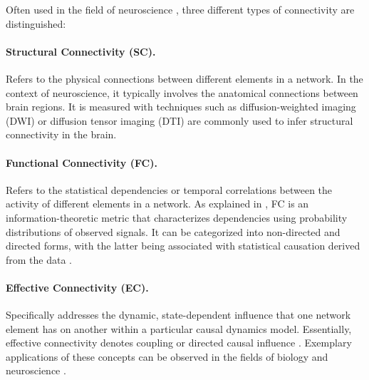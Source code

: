 Often used in the field of neuroscience \cite{Karwowski2019Applicationgraphtheory}, three different types of connectivity are distinguished\cite{Park2013Structuralfunctionalbrain,FaskowitzEdgesbrainnetworks}:

\paragraph*{Structural Connectivity (SC).} Refers to the physical connections between different elements in a network. In the context of neuroscience, it typically involves the anatomical connections between brain regions. It is measured with techniques such as diffusion-weighted imaging (DWI) or diffusion tensor imaging (DTI) are commonly used to infer structural connectivity in the brain.

\paragraph*{Functional Connectivity (FC).} Refers to the statistical dependencies or temporal correlations between the activity of different elements in a network. As explained in \cite{Friston2011Functionaleffectiveconnectivity}, FC is an information-theoretic metric that characterizes dependencies using probability distributions of observed signals. It can be categorized into non-directed and directed forms, with the latter being associated with statistical causation derived from the data \cite{Bastos2016tutorialreviewfunctional}. %

\paragraph*{Effective Connectivity (EC).} Specifically addresses the dynamic, state-dependent influence that one network element has on another within a particular causal dynamics model. Essentially, effective connectivity denotes coupling or directed causal influence \cite{Park2013Structuralfunctionalbrain}. Exemplary applications of these concepts can be observed in the fields of biology \cite{Zhang2017Networkbasedmachine} and neuroscience \cite{Karwowski2019Applicationgraphtheory,Sporns2018Graphtheorymethods}.

